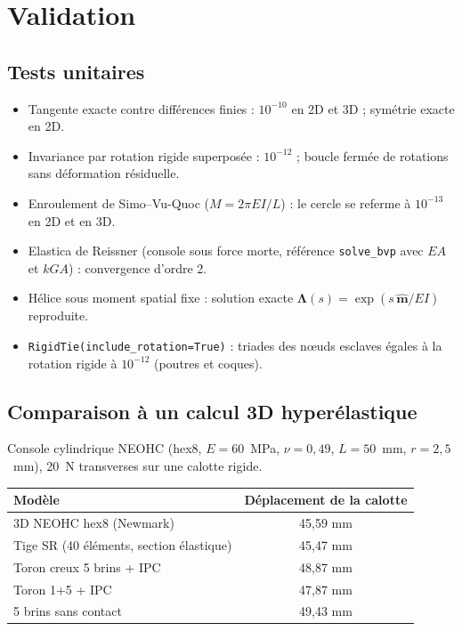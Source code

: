 \documentclass[11pt,a4paper]{article}
\newcommand{\hatv}[1]{\widehat{\bm{#1}}}
\newcommand{\Lam}{\bm{\Lambda}}
\newcommand{\code}[1]{\texttt{#1}}
\begin{document}
\section{Validation}
\label{sec:valid}

\subsection{Tests unitaires}
\begin{itemize}
\item Tangente exacte contre différences finies : $10^{-10}$ en 2D et 3D ;
symétrie exacte en 2D.
\item Invariance par rotation rigide superposée : $10^{-12}$ ; boucle fermée de
rotations sans déformation résiduelle.
\item Enroulement de Simo--Vu-Quoc ($M=2\pi EI/L$) : le cercle se referme à
$10^{-13}$ en 2D et en 3D.
\item Elastica de Reissner (console sous force morte, référence
\code{solve\_bvp} avec $EA$ et $kGA$) : convergence d'ordre 2.
\item Hélice sous moment spatial fixe : solution exacte
$\Lam(s)=\exp(s\,\hatv m/EI)$ reproduite.
\item \code{RigidTie(include\_rotation=True)} : triades des nœuds esclaves égales
à la rotation rigide à $10^{-12}$ (poutres et coques).
\end{itemize}

\subsection{Comparaison à un calcul 3D hyperélastique}
Console cylindrique NEOHC (hex8, $E=60$~MPa, $\nu=0{,}49$, $L=50$~mm,
$r=2{,}5$~mm), 20~N transverses sur une calotte rigide.
\begin{center}
\small
\begin{tabular}{lc}
\toprule
Modèle & Déplacement de la calotte\\
\midrule
3D NEOHC hex8 (Newmark) & 45,59 mm\\
Tige SR (40 éléments, section élastique) & 45,47 mm\\
Toron creux 5 brins + IPC & 48,87 mm\\
Toron 1+5 + IPC & 47,87 mm\\
5 brins sans contact & 49,43 mm\\
\bottomrule
\end{tabular}
\end{center}
\end{document}
